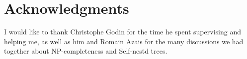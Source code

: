 \section*{Acknowledgments}

I would like to thank Christophe Godin for the time he spent
supervising and helping me, as well as him and Romain Azais for the
many discussions we had together about NP-completeness and Self-nestd
trees.
